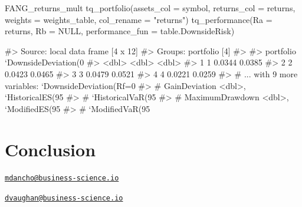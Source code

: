\begin{Schunk}
\begin{Sinput}
FANG_returns_mult %
    tq_portfolio(assets_col = symbol, returns_col = returns,
                 weights = weights_table, col_rename = "returns") %
    tq_performance(Ra = returns, Rb = NULL, performance_fun = table.DownsideRisk)
\end{Sinput}
\begin{Soutput}
#> Source: local data frame [4 x 12]
#> Groups: portfolio [4]
#> 
#>   portfolio `DownsideDeviation(0%
#>       <dbl>                   <dbl>                        <dbl>
#> 1         1                  0.0344                       0.0385
#> 2         2                  0.0423                       0.0465
#> 3         3                  0.0479                       0.0521
#> 4         4                  0.0221                       0.0259
#> # ... with 9 more variables: `DownsideDeviation(Rf=0%
#> #   GainDeviation <dbl>, `HistoricalES(95%
#> #   `HistoricalVaR(95%
#> #   MaximumDrawdown <dbl>, `ModifiedES(95%
#> #   `ModifiedVaR(95%
\end{Soutput}
\end{Schunk}

\section{Conclusion}\label{conclusion}

\address{%
Matt Dancho\\
Business Science\\
\\
}
\href{mailto:mdancho@business-science.io}{\nolinkurl{mdancho@business-science.io}}

\address{%
Davis Vaughan\\
Business Science\\
\\
}
\href{mailto:dvaughan@business-science.io}{\nolinkurl{dvaughan@business-science.io}}


